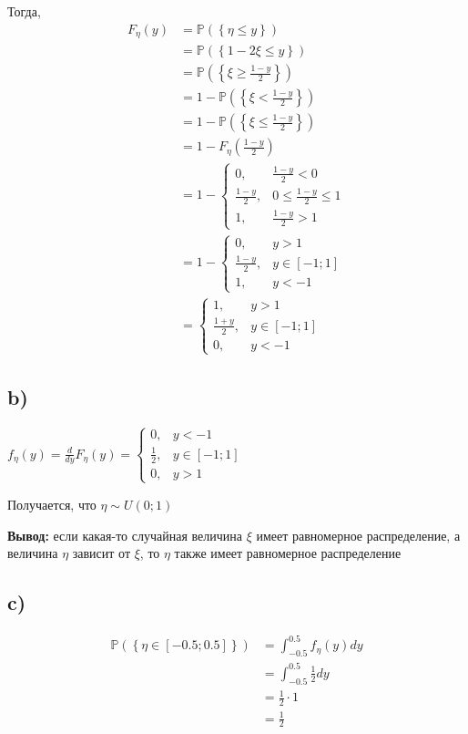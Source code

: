 \documentclass[a4paper, 10pt]{article}
\newcommand{\prob}[1]{\mathbb{P}\left(\left\{#1\right\}\right)}
\begin{document}
Тогда,
\begin{equation*}
    \begin{aligned}
        F_{\eta}(y)&=\prob{\eta\leqslant y}\\
        &=\prob{1-2\xi\leqslant y}\\
        &=\prob{\xi\geqslant\frac{1-y}{2}}\\
        &=1-\prob{\xi<\frac{1-y}{2}}\\
        &=1-\prob{\xi\leqslant\frac{1-y}{2}}\\
        &=1-F_{\eta}\left(\frac{1-y}{2}\right)\\
        &=1-\begin{cases}
            0,&\frac{1-y}{2}<0\\
            \frac{1-y}{2},&0\leqslant\frac{1-y}{2}\leqslant1\\
            1,&\frac{1-y}{2}>1
        \end{cases}\\
        &=1-\begin{cases}
            0,&y>1\\
            \frac{1-y}{2},&y\in[-1;1]\\
            1,&y<-1
        \end{cases}\\
        &=\begin{cases}
            1,&y>1\\
            \frac{1+y}{2},&y\in[-1;1]\\
            0,&y<-1
        \end{cases}
    \end{aligned}
\end{equation*}

\subsection*{b)}
$f_{\eta}(y)=\displaystyle\frac{d}{dy}F_{\eta}(y)=\begin{cases}
    0,&y<-1\\
    \frac{1}{2},&y\in[-1;1]\\
    0,&y>1
\end{cases}$

Получается, что $\eta\sim U(0;1)$

\textbf{Вывод:} если какая-то случайная величина $\xi$ имеет равномерное распределение, а величина $\eta$ зависит от $\xi$, то $\eta$ также имеет равномерное распределение

\subsection*{c)}
\begin{equation*}
    \begin{aligned}
        \prob{\eta\in[-0.5;0.5]}&=\int_{-0.5}^{0.5}f_{\eta}(y)dy\\
        &=\int_{-0.5}^{0.5}\frac{1}{2}dy\\
        &=\frac{1}{2}\cdot1\\
        &=\frac{1}{2}
    \end{aligned}
\end{equation*}
\end{document}
